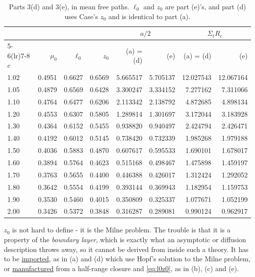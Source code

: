 \documentclass[11pt]{article}
\begin{document}
\begin{table}[hbt!]
    \centering
    \begin{tabular}{lrrrrrrr}
        \toprule
        & & & & \multicolumn{2}{c}{$a/2$} & \multicolumn{2}{c}{$\Sigma_t R_c$} \\
        \cmidrule(lr){5-6}\cmidrule(lr){7-8}
        $c$ & $\mu_0$ & $\ell_0$ & $z_0$ & (a) = (d) & (e) & (a) = (d) & (e) \\
        \midrule
        1.02 & 0.4951 & 0.6627 & 0.6569 & 5.665517 & 5.705137 & 12.027543 & 12.067164 \\
        1.05 & 0.4879 & 0.6569 & 0.6428 & 3.300247 & 3.334152 & 7.277162 & 7.311066 \\
        1.10 & 0.4764 & 0.6477 & 0.6206 & 2.113342 & 2.138792 & 4.872685 & 4.898134 \\
        1.20 & 0.4553 & 0.6307 & 0.5805 & 1.289814 & 1.301697 & 3.172044 & 3.183928 \\
        1.30 & 0.4364 & 0.6152 & 0.5455 & 0.938820 & 0.940497 & 2.424794 & 2.426471 \\
        1.40 & 0.4192 & 0.6012 & 0.5145 & 0.738420 & 0.732339 & 1.985268 & 1.979188 \\
        1.50 & 0.4036 & 0.5883 & 0.4870 & 0.607617 & 0.595533 & 1.690101 & 1.678017 \\
        1.60 & 0.3894 & 0.5764 & 0.4623 & 0.515168 & 0.498467 & 1.475898 & 1.459197 \\
        1.70 & 0.3763 & 0.5655 & 0.4400 & 0.446388 & 0.426017 & 1.312424 & 1.292052 \\
        1.80 & 0.3642 & 0.5554 & 0.4199 & 0.393144 & 0.369943 & 1.182954 & 1.159753 \\
        1.90 & 0.3530 & 0.5460 & 0.4015 & 0.350809 & 0.325337 & 1.077671 & 1.052199 \\
        2.00 & 0.3426 & 0.5372 & 0.3848 & 0.316287 & 0.289081 & 0.990124 & 0.962917 \\
        \bottomrule
    \end{tabular}
    \caption{Parts 3(d) and 3(e), in mean free paths. $\ell_0$ and $z_0$ are
    part (e)'s, and part (d) uses Case's $z_0$ and is identical to part (a).}
    \label{tab:q3de}
\end{table}

\begin{notebox}
$z_0$ is not hard to define - it is the Milne problem. The trouble is that it is a property of
the \emph{boundary layer}, which is exactly what an asymptotic or diffusion description throws
away, so it cannot be derived from inside such a theory. It has to be \underline{imported}, as in (a) and
(d) which use Hopf's solution to the Milne problem, or \underline{manufactured} from a half-range closure and \eqref{eq:l0z0}, as in (b), (c) and (e).
\end{notebox}
\end{document}
